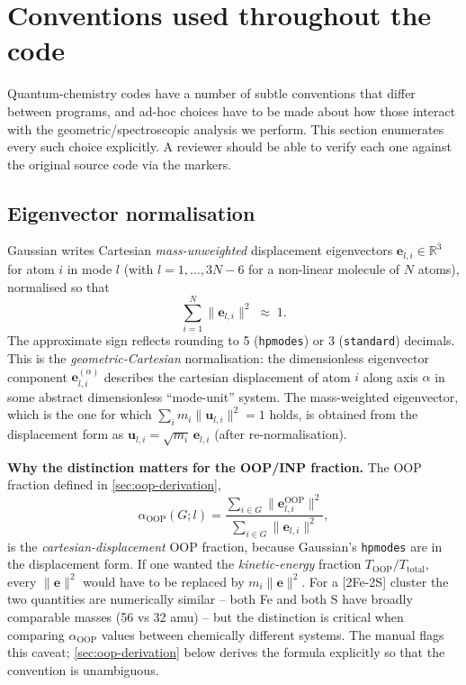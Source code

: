 \documentclass[10pt,a4paper,twoside]{article}
\newcommand{\R}{\mathbb{R}}
\newcommand{\evec}{\mathbf{e}}
\newcommand{\OOP}{\mathrm{OOP}}
\newcommand{\codref}[1]{%
  \quad\text{\textcolor{gray!70!black}{\footnotesize $\rightsquigarrow$~\texttt{#1}}}}
\begin{document}
\section{Conventions used throughout the code}
\label{sec:conventions}

Quantum-chemistry codes have a number of subtle conventions that
differ between programs, and ad-hoc choices have to be made about how
those interact with the geometric/spectroscopic analysis we
perform. This section enumerates every such choice explicitly. A
reviewer should be able to verify each one against the original
source code via the \codref{} markers.

\subsection{Eigenvector normalisation}
\label{sec:conv-eigvec}

\codref{logio.get\_eigvec}

Gaussian writes Cartesian \emph{mass-unweighted} displacement
eigenvectors $\evec_{l,i} \in \R^3$ for atom $i$ in mode $l$ (with
$l = 1, \ldots, 3N - 6$ for a non-linear molecule of $N$ atoms),
normalised so that
\begin{equation}
  \sum_{i=1}^{N} \lVert\evec_{l,i}\rVert^2 \;\approx\; 1.
  \label{eq:eigvec-norm}
\end{equation}
The approximate sign reflects rounding to 5 (\texttt{hpmodes}) or 3
(\texttt{standard}) decimals. This is the \emph{geometric-Cartesian}
normalisation: the dimensionless eigenvector component
$\evec_{l,i}^{(\alpha)}$ describes the cartesian displacement of atom
$i$ along axis $\alpha$ in some abstract dimensionless ``mode-unit''
system. The mass-weighted eigenvector, which is the one for which
$\sum_i m_i \lVert \bm{u}_{l,i}\rVert^2 = 1$ holds, is obtained from
the displacement form as $\bm{u}_{l,i} = \sqrt{m_i}\,\evec_{l,i}$
(after re-normalisation).

\begin{infobox}
\textbf{Why the distinction matters for the OOP/INP fraction.}
The OOP fraction defined in \cref{sec:oop-derivation},
\begin{equation*}
  \alpha_{\OOP}(G; l) = \frac{\sum_{i \in G}\lVert\evec_{l,i}^{\OOP}\rVert^2}
                              {\sum_{i \in G}\lVert\evec_{l,i}\rVert^2},
\end{equation*}
is the \emph{cartesian-displacement} OOP fraction, because Gaussian's
\texttt{hpmodes} are in the displacement form. If one wanted the
\emph{kinetic-energy} fraction
$T_{\OOP}/T_{\text{total}}$, every $\lVert\evec\rVert^2$ would have to
be replaced by $m_i \lVert\evec\rVert^2$. For a [2Fe-2S] cluster the
two quantities are numerically similar -- both Fe and both S have
broadly comparable masses (56 vs 32 amu) -- but the distinction is
critical when comparing $\alpha_{\OOP}$ values between chemically
different systems. The manual flags this caveat;
\cref{sec:oop-derivation} below derives the formula explicitly so
that the convention is unambiguous.
\end{infobox}
\end{document}
